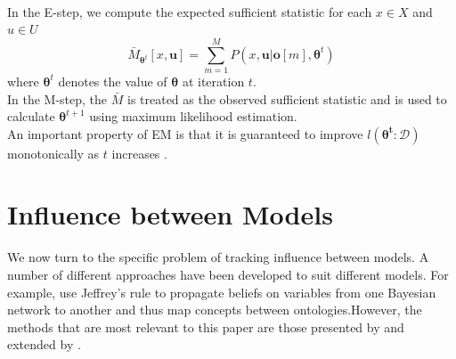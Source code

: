 \documentclass [11pt]{article}
\begin{document}
\\
In the E-step, we compute the expected sufficient statistic for each $x\in X$ and $u \in U$
\begin{equation*}
\bar{M}_{\boldsymbol{\theta}^{t}}[x,\boldsymbol{u}] = \sum_{m=1}^{M}P(x,\boldsymbol{u}|\boldsymbol{o}[m],\boldsymbol{\theta}^{t})
\end{equation*}
where $\boldsymbol{\theta}^{t}$ denotes the value of $\boldsymbol{\theta}$ at iteration $t$.
\\
In the M-step, the $\bar{M}$ is treated as the observed sufficient statistic and is used to calculate $\boldsymbol{\theta}^{t+1}$ using maximum likelihood estimation.
\\
An important property of EM is that it is guaranteed to improve $l(\boldsymbol{\theta^{t}}:\mathcal{D})$ monotonically as $t$ increases \citep{koller09}.
\section{Influence between Models}\label{InfluenceBetweenModels}
We now turn to the specific problem of tracking influence between models. A number of different approaches have been developed to suit different models. For example, \cite{Pan05} use Jeffrey's rule \citep{pearl90} to propagate beliefs on variables from one Bayesian network to another and thus map concepts between ontologies.However, the methods that are most relevant to this paper are those presented by \cite{ajoodha17} and extended by \citep{ajoodha18}.


\end{document}
